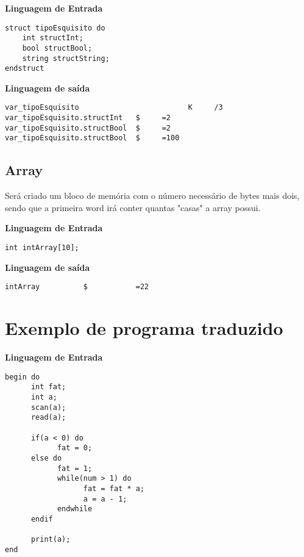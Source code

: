 \textbf{Linguagem de Entrada}\\

\begin{lstlisting}
struct tipoEsquisito do
    int structInt;
    bool structBool;
    string structString;
endstruct
\end{lstlisting}

\textbf{Linguagem de saída} \\

\begin{lstlisting}
var_tipoEsquisito                         K     /3
var_tipoEsquisito.structInt   $     =2
var_tipoEsquisito.structBool  $     =2
var_tipoEsquisito.structBool  $     =100

\end{lstlisting}

\subsection{Array}

Será criado um bloco de memória com o número necessário de bytes mais dois, sendo que a primeira word irá conter quantas "casas" a array possui.

\textbf{Linguagem de Entrada}\\

\begin{lstlisting}
int intArray[10];
\end{lstlisting}

\textbf{Linguagem de saída} \\

\begin{lstlisting}
intArray          $           =22
\end{lstlisting}

\section{Exemplo de programa traduzido}

\textbf{Linguagem de Entrada}\\

\begin{lstlisting}
begin do
      int fat;
      int a;
      scan(a);
      read(a);

      if(a < 0) do
            fat = 0;
      else do
            fat = 1;
            while(num > 1) do
                  fat = fat * a;
                  a = a - 1;
            endwhile
      endif

      print(a);
end

\end{lstlisting}

